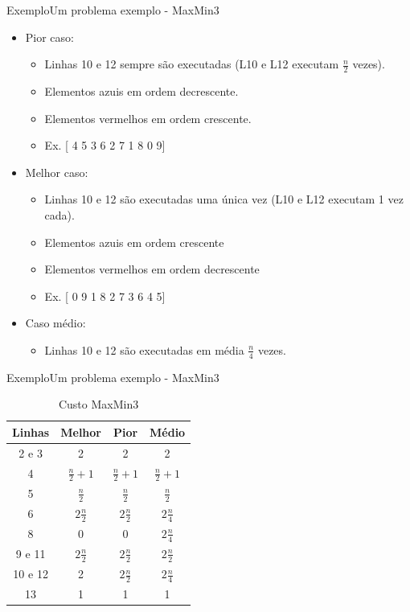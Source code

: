 \documentclass[aspectratio=169]{beamer}
\begin{document}
\begin{frame}{Exemplo}{Um problema exemplo - MaxMin3}
\begin{itemize}
\item Pior caso:
\begin{itemize}
\item Linhas 10 e 12 sempre são executadas (L10 e L12 executam $\frac{n}{2}$ vezes).
\item Elementos azuis em ordem decrescente.
\item Elementos vermelhos em ordem crescente.
\item Ex. [\color{blue} 4 \color{red} 5 \color{blue} 3 \color{red} 6 \color{blue} 2 \color{red} 7 \color{blue} 1 \color{red} 8 \color{blue} 0 \color{red} 9]
\end{itemize}
\item Melhor caso:
\begin{itemize}
\item Linhas 10 e 12 são executadas uma única vez (L10 e L12 executam 1 vez cada).
\item Elementos azuis em ordem crescente
\item Elementos vermelhos em ordem decrescente
\item Ex. [\color{blue} 0 \color{red} 9 \color{blue} 1 \color{red} 8 \color{blue} 2 \color{red} 7 \color{blue} 3 \color{red} 6 \color{blue} 4 \color{red} 5]
\end{itemize}
\item Caso médio:
\begin{itemize}
\item Linhas 10 e 12 são executadas em média $\frac{n}{4}$ vezes.
\end{itemize}
\end{itemize}
\end{frame}


\begin{frame}{Exemplo}{Um problema exemplo - MaxMin3}
\begin{table}[]
\centering
\caption{Custo MaxMin3}
\label{Custo MaxMin3}
\begin{tabular}{c|ccc}
Linhas  &  Melhor  &  Pior  &  Médio  \\
\hline
2 e 3   & 2            &    2    &  2 \\
4       & $\frac{n}{2} + 1$  & $\frac{n}{2} + 1$     & $\frac{n}{2} + 1$ \\
5       & $\frac{n}{2}$       & $\frac{n}{2}$        & $\frac{n}{2}$  \\
6       & $2\frac{n}{2}$ &$2\frac{n}{2}$  & $2\frac{n}{4}$  \\
8      & 0 & 0  &  $2\frac{n}{4}$ \\
9 e 11 & $2\frac{n}{2}$ & $2\frac{n}{2}$& $2\frac{n}{2}$ \\
10 e 12 & 2 &  $2\frac{n}{2}$ &  $2\frac{n}{4}$ \\
13      & 1 & 1 & 1 \\
\end{tabular}
\end{table} 

\end{frame}
\end{document}
